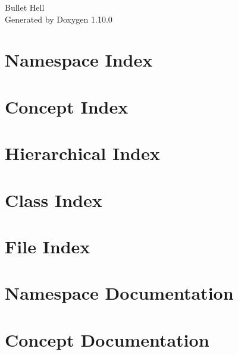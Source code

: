 \documentclass[twoside]{book}
\newcommand{\+}{\discretionary{\mbox{\scriptsize$\hookleftarrow$}}{}{}}
\newcommand{\clearemptydoublepage}{%
    \newpage{\pagestyle{empty}\cleardoublepage}%
  }
\begin{document}
  \raggedbottom
    \hypersetup{pageanchor=false,
                bookmarksnumbered=true,
                pdfencoding=unicode
               }
  \begin{titlepage}
  \vspace*{7cm}
  \begin{center}%
  {\Large Bullet Hell}\\
  \vspace*{1cm}
  {\large Generated by Doxygen 1.10.0}\\
  \end{center}
  \end{titlepage}
  \clearemptydoublepage
  \tableofcontents
  \clearemptydoublepage
  \hypersetup{pageanchor=true}
\chapter{Namespace Index}

\chapter{Concept Index}

\chapter{Hierarchical Index}

\chapter{Class Index}

\chapter{File Index}

\chapter{Namespace Documentation}

\chapter{Concept Documentation}

\end{document}
